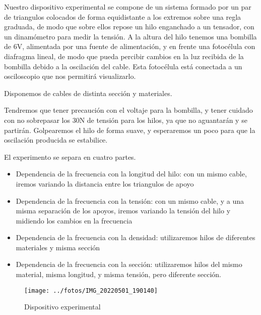 \documentclass[a4paper,12pt,spanish]{article}
\begin{document}
	
Nuestro dispositivo experimental se compone de un sistema formado por un par de triangulos colocados de forma equidistante a los extremos sobre una regla graduada, de modo que sobre ellos repose un hilo enganchado a un tensador, con un dinamómetro para medir la tensión.
A la altura del hilo tenemos una bombilla de 6V, alimentada por una fuente de alimentación, y en frente una fotocélula con diafragma lineal, de modo que pueda percibir cambios en la luz recibida de la bombilla debido a la oscilación del cable.
Esta fotocélula está conectada a un osciloscopio que nos permitirá visualizarlo.

Disponemos de cables de distinta sección y materiales.

Tendremos que tener precaución con el voltaje para la bombilla, y tener cuidado con no sobrepasar los 30N de tensión para los hilos, ya que no aguantarán y se partirán. Golpearemos el hilo de forma suave, y esperaremos un poco para que la oscilación producida se estabilice.

El experimento se separa en cuatro partes. 

\begin{itemize}
	\item{ Dependencia de la frecuencia con la longitud del hilo: con un mismo cable, iremos variando la distancia entre los triangulos de apoyo }
	\item{ Dependencia de la frecuencia con la tensión: con un mismo cable, y a una misma separación de los apoyos, iremos variando la tensión del hilo y midiendo los cambios en la frecuencia }
	\item{ Dependencia de la frecuencia con la densidad: utilizaremos hilos de diferentes materiales y misma sección }
	\item{ Dependencia de la frecuencia con la sección: utilizaremos hilos del mismo material, misma longitud, y misma tensión, pero diferente sección. }
\end{itemize}



\begin{figure}
	\centering
	\texttt{[image: ../fotos/IMG\_20220501\_190140]}
	\caption{Dispositivo experimental}
	\label{fig:img20220501190140}
\end{figure}
\end{document}
